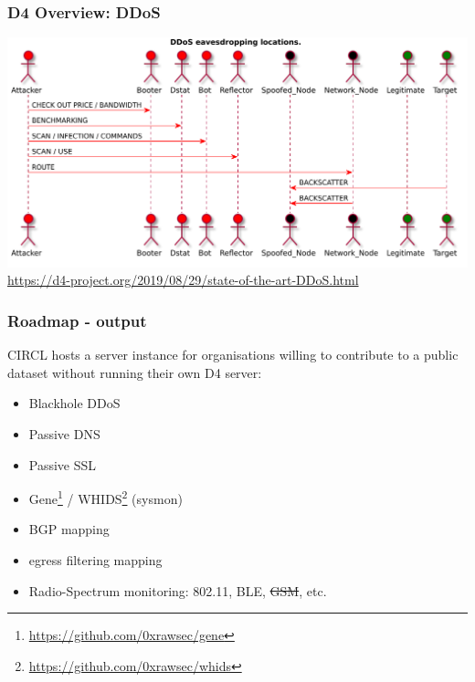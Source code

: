 \documentclass{beamer}
\begin{document}
\begin{frame}
\frametitle{D4 Overview: DDoS}
        \includegraphics[width=\textwidth]{../../diagram/theconversation.pdf}
        {\tiny \url{https://d4-project.org/2019/08/29/state-of-the-art-DDoS.html}}
\end{frame}

\begin{frame}
        \frametitle{Roadmap - output}

                  CIRCL hosts a server instance for organisations willing to
                  contribute to a public dataset without running their own D4 server:
                  \begin{itemize}
                  \item [\checkmark] Blackhole DDoS
                  \item [\checkmark] Passive DNS 
                  \item [\checkmark] Passive SSL 
                  \item Gene\footnote{\url{https://github.com/0xrawsec/gene}} / WHIDS\footnote{\url{https://github.com/0xrawsec/whids}} (sysmon)
                  \item BGP mapping 
                  \item egress filtering mapping
                  \item Radio-Spectrum monitoring: 802.11, BLE, \sout{GSM}, etc. 
                  \end{itemize}
\end{frame}
\end{document}
